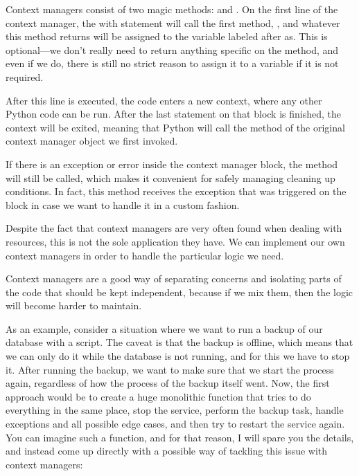 \documentclass[a4paper,10pt,english]{sphinxmanual}
\begin{document}
Context managers consist of two magic methods:  and . On the first line of the context manager,
the with statement will call the first method, , and whatever this method returns will be assigned to the
variable labeled after as. This is optional—we don’t really need to return anything specific on the 
method, and even if we do, there is still no strict reason to assign it to a variable if it is not required.

After this line is executed, the code enters a new context, where any other Python code can be run. After the last
statement on that block is finished, the context will be exited, meaning that Python will call the  method
of the original context manager object we first invoked.

If there is an exception or error inside the context manager block, the  method will still be called, which
makes it convenient for safely managing cleaning up conditions. In fact, this method receives the exception that was
triggered on the block in case we want to handle it in a custom fashion.

Despite the fact that context managers are very often found when dealing with resources,
this is not the sole application they have. We can implement our own context managers in order to handle the particular
logic we need.

Context managers are a good way of separating concerns and isolating parts of the code that should be kept independent,
because if we mix them, then the logic will become harder to maintain.

As an example, consider a situation where we want to run a backup of our database with a script. The caveat is that the
backup is offline, which means that we can only do it while the database is not running, and for this we have to stop
it. After running the backup, we want to make sure that we start the process again, regardless of how the process of the
backup itself went. Now, the first approach would be to create a huge monolithic function that tries to do everything
in the same place, stop the service, perform the backup task, handle exceptions and all possible edge cases, and then
try to restart the service again. You can imagine such a function, and for that reason, I will spare you the details,
and instead come up directly with a possible way of tackling this issue with context managers:
\end{document}

